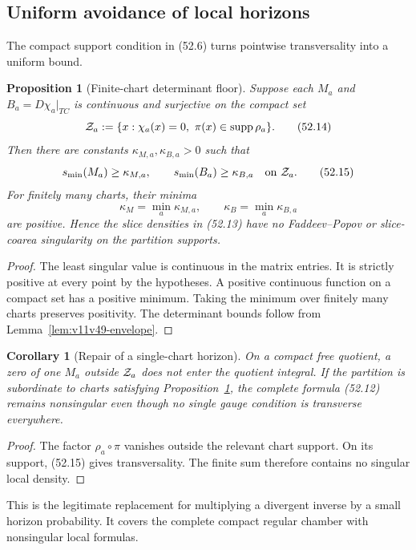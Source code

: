 \documentclass[11pt]{article}
\newtheorem{proposition}[theorem]{Proposition}
\newtheorem{corollary}[theorem]{Corollary}
\begin{document}
\subsection{Uniform avoidance of local horizons}

The compact support condition in (52.6) turns pointwise
transversality into a uniform bound.

\begin{proposition}[Finite-chart determinant floor]
\label{prop:v11v52-floor}
Suppose each \(M_a\) and \(B_a=D\chi_a|_{TC}\) is continuous and
surjective on the compact set
\[
 {\cal Z}_a
 :=\{x:\chi_a(x)=0,\ \pi(x)\in\operatorname{supp}\rho_a\}.    \tag{52.14}
\]
Then there are constants \(\kappa_{M,a},\kappa_{B,a}>0\) such that
\[
 s_{\min}(M_a)\ge\kappa_{M,a},\qquad
 s_{\min}(B_a)\ge\kappa_{B,a}\quad\text{on }{\cal Z}_a.       \tag{52.15}
\]
For finitely many charts, their minima
\[
 \kappa_M=\min_a\kappa_{M,a},\qquad
 \kappa_B=\min_a\kappa_{B,a}                                 \tag{52.16}
\]
are positive.  Hence the slice densities in (52.13) have no
Faddeev--Popov or slice-coarea singularity on the partition supports.
\end{proposition}

\begin{proof}
The least singular value is continuous in the matrix entries.
It is strictly positive at every point by the hypotheses.  A positive
continuous function on a compact set has a positive minimum.
Taking the minimum over finitely many charts preserves positivity.
The determinant bounds follow from
Lemma~\ref{lem:v11v49-envelope}.
\end{proof}

\begin{corollary}[Repair of a single-chart horizon]
\label{cor:v11v52-repair}
On a compact free quotient, a zero of one \(M_a\) outside
\({\cal Z}_a\) does not enter the quotient integral.  If the partition
is subordinate to charts satisfying
Proposition~\ref{prop:v11v52-floor}, the complete formula
(52.12) remains nonsingular even though no single gauge condition is
transverse everywhere.
\end{corollary}

\begin{proof}
The factor \(\rho_a\circ\pi\) vanishes outside the relevant chart
support.  On its support, (52.15) gives transversality.  The finite sum
therefore contains no singular local density.
\end{proof}

This is the legitimate replacement for multiplying a divergent inverse
by a small horizon probability.  It covers the complete compact regular
chamber with nonsingular local formulas.
\end{document}

